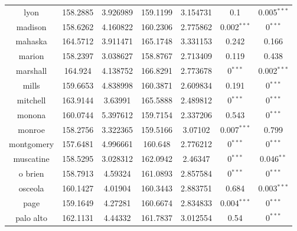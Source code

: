 \begin{table}[]
\begin{tabular}{|c|cc|cc|cc|}
lyon          & 158.2885  & 3.926989          & 159.1199  & 3.154731          & 0.1                           & 0.005$^{***}$ \\
madison       & 158.6262  & 4.160822          & 160.2306  & 2.775862          & 0.002$^{***}$ & 0$^{***}$     \\
mahaska       & 164.5712  & 3.911471          & 165.1748  & 3.331153          & 0.242                         & 0.166                         \\
marion        & 158.2397  & 3.038627          & 158.8767  & 2.713409          & 0.119                         & 0.438                         \\
marshall      & 164.924   & 4.138752          & 166.8291  & 2.773678          & 0$^{***}$     & 0.002$^{***}$ \\
mills         & 159.6653  & 4.838998          & 160.3871  & 2.609834          & 0.191                         & 0$^{***}$     \\
mitchell      & 163.9144  & 3.63991           & 165.5888  & 2.489812          & 0$^{***}$     & 0$^{***}$     \\
monona        & 160.0744  & 5.397612          & 159.7154  & 2.337206          & 0.543                         & 0$^{***}$     \\
monroe        & 158.2756  & 3.322365          & 159.5166  & 3.07102           & 0.007$^{***}$ & 0.799                         \\
montgomery    & 157.6481  & 4.996661          & 160.648   & 2.776212          & 0$^{***}$     & 0$^{***}$     \\
muscatine     & 158.5295  & 3.028312          & 162.0942  & 2.46347           & 0$^{***}$     & 0.046$^{**}$  \\
o brien       & 158.7913  & 4.59324           & 161.0893  & 2.857584          & 0$^{***}$     & 0$^{***}$     \\
osceola       & 160.1427  & 4.01904           & 160.3443  & 2.883751          & 0.684                         & 0.003$^{***}$ \\
page          & 159.1649  & 4.27281           & 160.6674  & 2.834833          & 0.004$^{***}$ & 0$^{***}$     \\
palo alto     & 162.1131  & 4.44332           & 161.7837  & 3.012554          & 0.54                          & 0$^{***}$     \\

\hline
\end{tabular}
\end{table}

